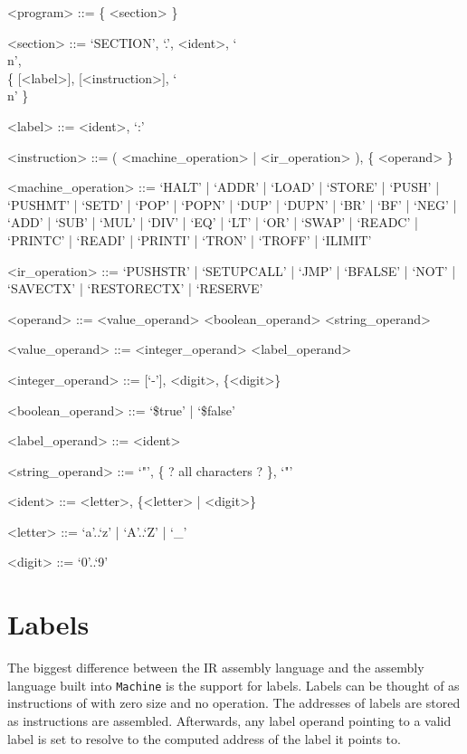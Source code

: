 \documentclass[oneside]{amsart}
\theoremstyle{definition}
\theoremstyle{remark}
\numberwithin{equation}{section}
\begin{document}
\setlength{\grammarindent}{12em}
\begin{grammar}
<program>           ::= \{ <section> \}

<section>           ::= `SECTION', `.', <ident>, `\\n', \\
                        \{ [<label>], [<instruction>], `\\n' \}

<label>             ::= <ident>, `:'

<instruction>       ::= ( <machine_operation> | <ir_operation> ), \{ <operand> \}

<machine_operation> ::= `HALT' | `ADDR' | `LOAD' | `STORE' | `PUSH' | `PUSHMT' | `SETD' | `POP' | `POPN' | `DUP' | `DUPN' | `BR' | `BF' | `NEG' | `ADD' | `SUB' | `MUL' | `DIV' | `EQ' | `LT' | `OR' | `SWAP' | `READC' | `PRINTC' | `READI' | `PRINTI' | `TRON' | `TROFF' | `ILIMIT'

<ir_operation>      ::= `PUSHSTR' | `SETUPCALL' | `JMP' | `BFALSE' | `NOT' | `SAVECTX' | `RESTORECTX' | `RESERVE'

<operand>           ::= <value_operand>
\alt                    <boolean_operand>
\alt                    <string_operand>

<value_operand>     ::= <integer_operand>
\alt                    <label_operand>

<integer_operand>   ::= [`-'], <digit>, \{<digit>\}

<boolean_operand>   ::= `\$true' | `\$false'

<label_operand>     ::= <ident>

<string_operand>    ::= `"', \{ ? all characters ? \}, `"'

<ident>             ::= <letter>, \{<letter> | <digit>\}

<letter>            ::= `a'..`z' | `A'..`Z' | `_'

<digit>             ::= `0'..`9'
\end{grammar}

\section{Labels}
The biggest difference between the IR assembly language and the assembly language built into
\texttt{Machine} is the support for labels. Labels can be thought of as instructions of with zero
size and no operation. The addresses of labels are stored as instructions are assembled. Afterwards,
any label operand pointing to a valid label is set to resolve to the computed address of the label
it points to.
\end{document}
